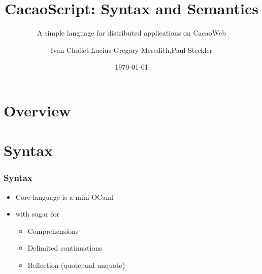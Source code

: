 \documentclass{beamer}
\title{CacaoScript: Syntax and Semantics}
\subtitle{A simple language for distributed applications on CacaoWeb}
\author{Ivan Chollet,Lucius Gregory Meredith,Paul Steckler}
\date{\today}
\begin{document}
  \frame{\titlepage}
  \section{Overview}
  \section{Syntax}
  \begin{frame}
    \frametitle{Syntax}
    \begin{itemize}
      \item Core language is a mini-OCaml
      \item with sugar for
        \begin{itemize}
          \item Comprehensions
          \item Delimited continuations
          \item Reflection (quote and unquote)
        \end{itemize}
    \end{itemize}
  \end{frame}
\end{document}
